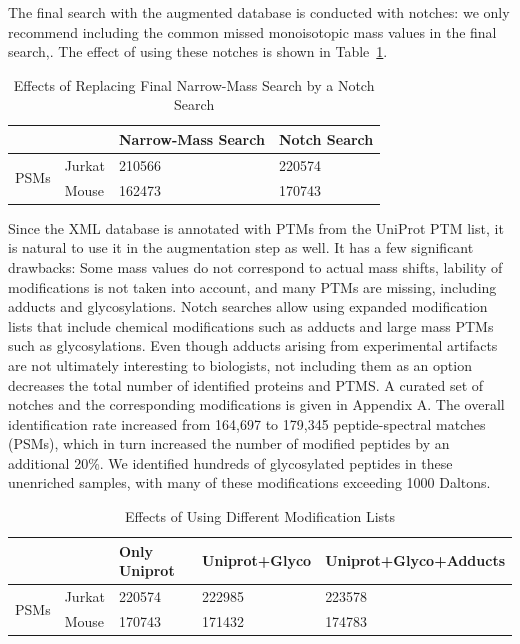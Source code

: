 \documentclass[journal=jprobs,manuscript=article]{achemso}
\begin{document}
The final search with the augmented database is conducted with notches: we only recommend including the common missed monoisotopic mass values in the final search,.
The effect of using these notches is shown in Table~\ref{tab:table2}.

\begin{table}[]
\centering
\caption{Effects of Replacing Final Narrow-Mass Search by a Notch Search}
\label{tab:table2}
\begin{tabular}{ll|l|l}
                      &        & Narrow-Mass Search & Notch Search\\
\hline
\multirow{2}{*}{PSMs} & Jurkat  & 210566   &  220574  \\
                      & Mouse    & 162473   &   170743
\end{tabular}
\end{table}

Since the XML database is annotated with PTMs from the UniProt PTM list, it is natural to use it in the augmentation step as well.
It has a few significant drawbacks: Some mass values do not correspond to actual mass shifts, lability of modifications is not taken into account, and many PTMs are missing, including adducts and glycosylations.
Notch searches allow using expanded modification lists that include chemical modifications such as adducts and large mass PTMs such as glycosylations.
Even though adducts arising from experimental artifacts are not ultimately interesting to biologists, not including them as an option decreases the total number of identified proteins and PTMS.
A curated set of notches and the corresponding modifications is given in Appendix A.
The overall identification rate increased from 164,697 to 179,345 peptide-spectral matches (PSMs), which in turn increased the number of modified peptides by an additional 20\%.
We identified hundreds of glycosylated peptides in these unenriched samples, with many of these modifications exceeding 1000 Daltons. 

\begin{table}[]
\centering
\caption{Effects of Using Different Modification Lists}
\label{tab:table3}
\begin{tabular}{ll|l|l|l}
                      &        & Only Uniprot & Uniprot+Glyco & Uniprot+Glyco+Adducts\\
\hline
\multirow{2}{*}{PSMs} & Jurkat  & 220574   &  222985 & 223578\\
                      & Mouse    & 170743   &   171432& 174783 
\end{tabular}
\end{table}
\end{document}
